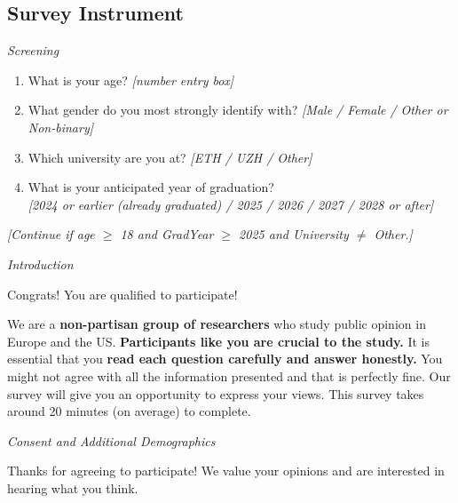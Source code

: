 \documentclass[12pt,notitlepage]{article}
\theoremstyle{plain}
\theoremstyle{plain}
\theoremstyle{definition}
\theoremstyle{definition}
\theoremstyle{assumption}
\theoremstyle{plain}
\theoremstyle{plain}
\theoremstyle{plain}
\theoremstyle{plain}
\theoremstyle{definition}%
\theoremstyle{plain}
\theoremstyle{plain}
\theoremstyle{plain}
\theoremstyle{plain}
\begin{document}
\clearpage 

\subsection{Survey Instrument \label{app:SurveyInstrument}}

\vspace{12pt}
\emph{Screening}

\begin{enumerate}
\item What is your age? \emph{[number entry box]}
\item What gender do you most strongly identify with? \emph{[Male / Female / Other or Non-binary]}
\item Which university are you at? \emph{[ETH / UZH / Other]}
\item What is your anticipated year of graduation?\\
\emph{[2024 or earlier (already graduated) / 2025 / 2026 / 2027 / 2028 or after]}
\end{enumerate}

\emph{[Continue if age $\geq$ 18 and GradYear $\geq$ 2025 and University $\neq$ Other.]}

\vspace{12pt}
\emph{Introduction}

Congrats! You are qualified to participate!

We are a \textbf{non-partisan group of researchers} who study public opinion in Europe and the US. \textbf{Participants like you are crucial to the study.} It is essential that you \textbf{read each question carefully and answer honestly.} You might not agree with all the information presented and that is perfectly fine. Our survey will give you an opportunity to express your views. This survey takes around 20 minutes (on average) to complete.

\vspace{12pt}
\emph{Consent and Additional Demographics}

Thanks for agreeing to participate! We value your opinions and are interested in hearing what you think.
\end{document}
